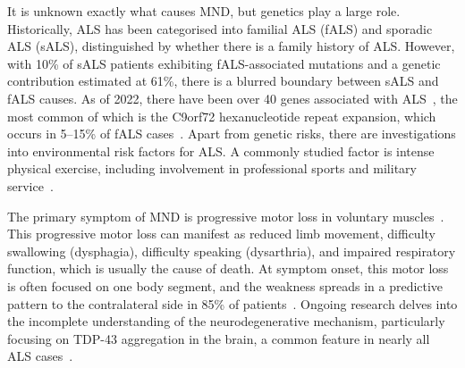It is unknown exactly what causes MND, but genetics play a large role.
Historically, ALS has been categorised into familial ALS (fALS) and sporadic ALS (sALS), distinguished by whether there is a family history of ALS.
However, with 10\% of sALS patients exhibiting fALS-associated mutations and a genetic contribution estimated at 61\%, there is a blurred boundary between sALS and fALS causes.
As of 2022, there have been over 40 genes associated with ALS~\cite{goutmanRecentAdvancesDiagnosis2022a}, the most common of which is the C9orf72 hexanucleotide repeat expansion, which occurs in 5--15\% of fALS cases~\cite{vanesAmyotrophicLateralSclerosis2017}.
Apart from genetic risks, there are investigations into environmental risk factors for ALS. A commonly studied factor is intense physical exercise, including involvement in professional sports and military service~\cite{mckayMilitaryServiceRelated2021, lacortePhysicalActivityPhysical2016}.


The primary symptom of MND is progressive motor loss in voluntary muscles~\cite{vanesAmyotrophicLateralSclerosis2017}.
This progressive motor loss can manifest as reduced limb movement, difficulty swallowing (dysphagia), difficulty speaking (dysarthria), and impaired respiratory function, which is usually the cause of death.
At symptom onset, this motor loss is often focused on one body segment, and the weakness spreads in a predictive pattern to the contralateral side in 85\% of patients~\cite{walhoutPatternsSymptomDevelopment2018}.
Ongoing research delves into the incomplete understanding of the neurodegenerative mechanism, particularly focusing on TDP-43 aggregation in the brain, a common feature in nearly all ALS cases~\cite{blokhuisProteinAggregationAmyotrophic2013}.

